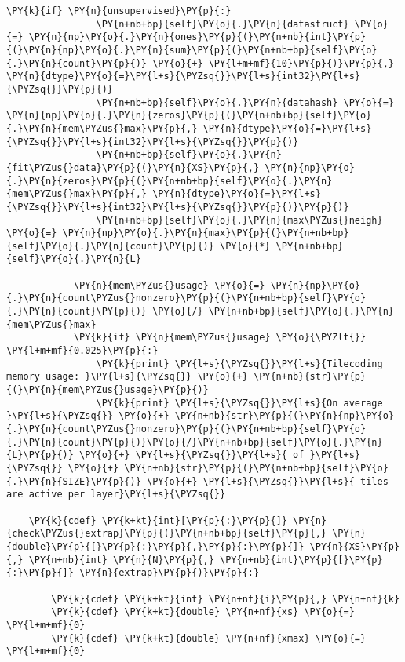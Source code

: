 \begin{Verbatim}[commandchars=\\\{\}]
            \PY{k}{if} \PY{n}{unsupervised}\PY{p}{:}
                \PY{n+nb+bp}{self}\PY{o}{.}\PY{n}{datastruct} \PY{o}{=} \PY{n}{np}\PY{o}{.}\PY{n}{ones}\PY{p}{(}\PY{n+nb}{int}\PY{p}{(}\PY{n}{np}\PY{o}{.}\PY{n}{sum}\PY{p}{(}\PY{n+nb+bp}{self}\PY{o}{.}\PY{n}{count}\PY{p}{)} \PY{o}{+} \PY{l+m+mf}{10}\PY{p}{)}\PY{p}{,} \PY{n}{dtype}\PY{o}{=}\PY{l+s}{\PYZsq{}}\PY{l+s}{int32}\PY{l+s}{\PYZsq{}}\PY{p}{)}
                \PY{n+nb+bp}{self}\PY{o}{.}\PY{n}{datahash} \PY{o}{=} \PY{n}{np}\PY{o}{.}\PY{n}{zeros}\PY{p}{(}\PY{n+nb+bp}{self}\PY{o}{.}\PY{n}{mem\PYZus{}max}\PY{p}{,} \PY{n}{dtype}\PY{o}{=}\PY{l+s}{\PYZsq{}}\PY{l+s}{int32}\PY{l+s}{\PYZsq{}}\PY{p}{)}
                \PY{n+nb+bp}{self}\PY{o}{.}\PY{n}{fit\PYZus{}data}\PY{p}{(}\PY{n}{XS}\PY{p}{,} \PY{n}{np}\PY{o}{.}\PY{n}{zeros}\PY{p}{(}\PY{n+nb+bp}{self}\PY{o}{.}\PY{n}{mem\PYZus{}max}\PY{p}{,} \PY{n}{dtype}\PY{o}{=}\PY{l+s}{\PYZsq{}}\PY{l+s}{int32}\PY{l+s}{\PYZsq{}}\PY{p}{)}\PY{p}{)}
                \PY{n+nb+bp}{self}\PY{o}{.}\PY{n}{max\PYZus{}neigh} \PY{o}{=} \PY{n}{np}\PY{o}{.}\PY{n}{max}\PY{p}{(}\PY{n+nb+bp}{self}\PY{o}{.}\PY{n}{count}\PY{p}{)} \PY{o}{*} \PY{n+nb+bp}{self}\PY{o}{.}\PY{n}{L}

            \PY{n}{mem\PYZus{}usage} \PY{o}{=} \PY{n}{np}\PY{o}{.}\PY{n}{count\PYZus{}nonzero}\PY{p}{(}\PY{n+nb+bp}{self}\PY{o}{.}\PY{n}{count}\PY{p}{)} \PY{o}{/} \PY{n+nb+bp}{self}\PY{o}{.}\PY{n}{mem\PYZus{}max}
            \PY{k}{if} \PY{n}{mem\PYZus{}usage} \PY{o}{\PYZlt{}} \PY{l+m+mf}{0.025}\PY{p}{:}
                \PY{k}{print} \PY{l+s}{\PYZsq{}}\PY{l+s}{Tilecoding memory usage: }\PY{l+s}{\PYZsq{}} \PY{o}{+} \PY{n+nb}{str}\PY{p}{(}\PY{n}{mem\PYZus{}usage}\PY{p}{)}
                \PY{k}{print} \PY{l+s}{\PYZsq{}}\PY{l+s}{On average }\PY{l+s}{\PYZsq{}} \PY{o}{+} \PY{n+nb}{str}\PY{p}{(}\PY{n}{np}\PY{o}{.}\PY{n}{count\PYZus{}nonzero}\PY{p}{(}\PY{n+nb+bp}{self}\PY{o}{.}\PY{n}{count}\PY{p}{)}\PY{o}{/}\PY{n+nb+bp}{self}\PY{o}{.}\PY{n}{L}\PY{p}{)} \PY{o}{+} \PY{l+s}{\PYZsq{}}\PY{l+s}{ of }\PY{l+s}{\PYZsq{}} \PY{o}{+} \PY{n+nb}{str}\PY{p}{(}\PY{n+nb+bp}{self}\PY{o}{.}\PY{n}{SIZE}\PY{p}{)} \PY{o}{+} \PY{l+s}{\PYZsq{}}\PY{l+s}{ tiles are active per layer}\PY{l+s}{\PYZsq{}}
    
    \PY{k}{cdef} \PY{k+kt}{int}[\PY{p}{:}\PY{p}{]} \PY{n}{check\PYZus{}extrap}\PY{p}{(}\PY{n+nb+bp}{self}\PY{p}{,} \PY{n}{double}\PY{p}{[}\PY{p}{:}\PY{p}{,}\PY{p}{:}\PY{p}{]} \PY{n}{XS}\PY{p}{,} \PY{n+nb}{int} \PY{n}{N}\PY{p}{,} \PY{n+nb}{int}\PY{p}{[}\PY{p}{:}\PY{p}{]} \PY{n}{extrap}\PY{p}{)}\PY{p}{:}

        \PY{k}{cdef} \PY{k+kt}{int} \PY{n+nf}{i}\PY{p}{,} \PY{n+nf}{k}
        \PY{k}{cdef} \PY{k+kt}{double} \PY{n+nf}{xs} \PY{o}{=} \PY{l+m+mf}{0}
        \PY{k}{cdef} \PY{k+kt}{double} \PY{n+nf}{xmax} \PY{o}{=} \PY{l+m+mf}{0}


\end{Verbatim}
